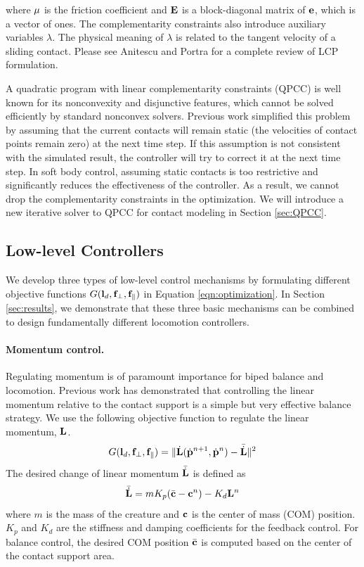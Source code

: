 where $\mathbf{\mu}$ is the friction coefficient and $\mathbf{E}$ is a
block-diagonal matrix of $\mathbf{e}$, which is a vector of ones. The
complementarity constraints also introduce auxiliary variables
$\lambda$. The physical meaning of $\lambda$ is related to the tangent
velocity of a sliding contact. Please see Anitescu and Portra
\cite{Anitescu:1997} for a complete review of LCP formulation.

A quadratic program with linear complementarity constraints (QPCC) is
well known for its nonconvexity and disjunctive features, which cannot
be solved efficiently by standard nonconvex solvers. Previous work
simplified this problem by assuming that the current contacts will
remain static (the velocities of contact points remain zero) at the next time step. If this assumption is not
consistent with the simulated result, the controller will try to
correct it at the next time step. In soft body control, assuming
static contacts is too restrictive and significantly reduces the
effectiveness of the controller. As a result, we cannot drop the
complementarity constraints in the optimization. We will introduce a
new iterative solver to QPCC for contact modeling in Section
\ref{sec:QPCC}.

\subsection{Low-level Controllers}
\label{sec:controller}
We develop three types of low-level control mechanisms by formulating different
objective functions $G(\mathbf{l}_d, \mathbf{f}_\perp, \mathbf{f}_\parallel)$ in
Equation \ref{eqn:optimization}. In Section \ref{sec:results}, we
demonstrate that these three basic mechanisms can be combined to
design fundamentally different locomotion controllers.

\paragraph{Momentum control.}
Regulating momentum is of paramount importance for biped balance and
locomotion. Previous work \cite{Macchietto:2009} has
demonstrated that controlling the linear momentum relative to the
contact support is a simple but very effective balance strategy. We
use the following objective function to regulate the linear momentum, $\mathbf{L}$.
\begin{equation}
G(\mathbf{l}_d, \mathbf{f}_\perp, \mathbf{f}_\parallel) = \| \dot{\mathbf{L}}(\dot{\mathbf{p}}^{n+1}, \dot{\mathbf{p}}^n) - \bar{\dot{\mathbf{L}}} \|^2
\end{equation}
The desired change of linear momentum $\bar{\dot{\mathbf{L}}}$ is defined as
\begin{equation}
\bar{\dot{\mathbf{L}}} = m K_p (\bar{\mathbf{c}} - \mathbf{c}^n) - K_d \mathbf{L}^n
\end{equation}
where $m$ is the mass of the creature and $\mathbf{c}$ is the center of
mass (COM) position. $K_p$ and $K_d$ are the stiffness and damping
coefficients for the feedback control. For balance control, the
desired COM position $\bar{\mathbf{c}}$ is computed based on the center of
the contact support area.

